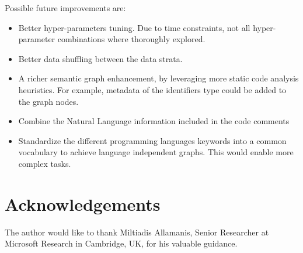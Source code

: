 \documentclass{article}
\begin{document}
Possible future improvements are: 
\begin{itemize}
  \item Better hyper-parameters tuning. Due to time constraints, not all hyper-parameter combinations where thoroughly explored.
  \item Better data shuffling between the data strata.
  \item A richer semantic graph enhancement, by leveraging more static code analysis heuristics. For example, metadata of the identifiers type could be added to the graph nodes.
  \item Combine the Natural Language information included in the code comments
  \item Standardize the different programming languages keywords into a common vocabulary to achieve language independent graphs. This would enable more complex tasks.
\end{itemize}


\section*{Acknowledgements}
The author would like to thank Miltiadis Allamanis, Senior Researcher at Microsoft Research in Cambridge, UK, for his valuable guidance.

  
 
\end{document}
